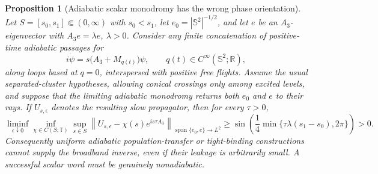 \documentclass[11pt]{article}
\newtheorem{proposition}[theorem]{Proposition}
\theoremstyle{remark}
\begin{document}
\begin{proposition}[Adiabatic scalar monodromy has the wrong phase orientation]
\label{prop:adiabatic-phase-orientation-no-go}
Let $S=[s_0,s_1]\Subset(0,\infty)$ with $s_0<s_1$, let
$e_0=|\mathbb S^2|^{-1/2}$, and let $e$ be an $A_3$-eigenvector with
$A_3e=\lambda e$, $\lambda>0$.  Consider any finite concatenation of
positive-time adiabatic passages for
\begin{equation}
 i\dot\psi=s\bigl(A_3+M_{q(t)}\bigr)\psi,
 \qquad q(t)\in C^\infty(\mathbb S^2;\mathbb R),
 \label{eq:adiabatic-scaled-scalar-flow}
\end{equation}
along loops based at $q=0$, interspersed with positive free flights.  Assume
the usual separated-cluster hypotheses, allowing conical crossings only among
excited levels, and suppose that the limiting adiabatic monodromy returns both
$e_0$ and $e$ to their rays.  If $U_{s,\epsilon}$ denotes the resulting slow
propagator, then for every $\tau>0$,
\begin{equation}
 \liminf_{\epsilon\downarrow0}
 \inf_{\chi\in C(S;\mathbb T)}
 \sup_{s\in S}
 \left\|
  U_{s,\epsilon}-\chi(s)e^{is\tau A_3}
 \right\|_{\operatorname{span}\{e_0,e\}\to L^2}
 \geq
 \sin\!\left(
  \frac14\min\{\tau\lambda(s_1-s_0),2\pi\}
 \right)>0.
 \label{eq:adiabatic-wrong-orientation-gap}
\end{equation}
Consequently uniform adiabatic population-transfer or tight-binding
constructions cannot supply the broadband inverse, even if their leakage is
arbitrarily small.  A successful scalar word must be genuinely nonadiabatic.
\end{proposition}
\end{document}
